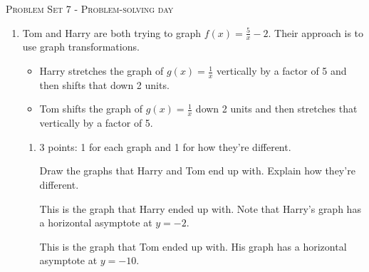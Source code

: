 \documentclass{article}
\begin{document}
\begin{center}
  \large\textsc{Problem Set 7 - Problem-solving day}
\end{center}


\begin{enumerate}
\item  Tom and Harry are both trying to graph $f(x) = \frac{5}{x} -2$. Their approach is to use graph transformations.
  \begin{itemize} 
  \item Harry stretches the graph of $g(x)=\frac{1}{x}$ vertically by a factor of 5 and then shifts that down 2 units.
  \item Tom shifts the graph of $g(x) = \frac{1}{x}$ down 2 units and then stretches that vertically by a factor of 5.
  \end{itemize}   

  \begin{enumerate} 
  \item

    \begin{grading}
      3 points: 1 for each graph and 1 for how they're different.
    \end{grading}

    \begin{problem}[\vfill]
      Draw the graphs that Harry and Tom end up with. Explain how they're different.
    \end{problem}

    \begin{solution} 
      This is the graph that Harry ended up with. Note that Harry's graph has a horizontal asymptote at $y=-2$.
      \begin{center}
      \end{center}
      This is the graph that Tom ended up with. His graph has a horizontal asymptote at $y=-10$.
      \begin{center}
      \end{center}
    \end{solution} 


\end{enumerate}
\end{enumerate}
\end{document}
